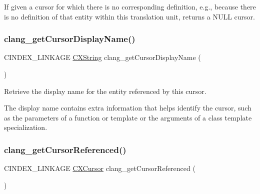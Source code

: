 If given a cursor for which there is no corresponding definition, e.\+g., because there is no definition of that entity within this translation unit, returns a N\+U\+LL cursor. \mbox{\label{group__CINDEX__CURSOR__XREF_gac3eba3224d109a956f9ef96fd4fe5c83}} 
\subsubsection{\texorpdfstring{clang\+\_\+get\+Cursor\+Display\+Name()}{clang\_getCursorDisplayName()}}
{\footnotesize\ttfamily C\+I\+N\+D\+E\+X\+\_\+\+L\+I\+N\+K\+A\+GE \mbox{\hyperlink{structCXString}{C\+X\+String}} clang\+\_\+get\+Cursor\+Display\+Name (\begin{DoxyParamCaption}\item[{\mbox{\hyperlink{structCXCursor}{C\+X\+Cursor}}}]{ }\end{DoxyParamCaption})}



Retrieve the display name for the entity referenced by this cursor. 

The display name contains extra information that helps identify the cursor, such as the parameters of a function or template or the arguments of a class template specialization. \mbox{\label{group__CINDEX__CURSOR__XREF_gabf059155921552e19fc2abed5b4ff73a}} 
\subsubsection{\texorpdfstring{clang\+\_\+get\+Cursor\+Referenced()}{clang\_getCursorReferenced()}}
{\footnotesize\ttfamily C\+I\+N\+D\+E\+X\+\_\+\+L\+I\+N\+K\+A\+GE \mbox{\hyperlink{structCXCursor}{C\+X\+Cursor}} clang\+\_\+get\+Cursor\+Referenced (\begin{DoxyParamCaption}\item[{\mbox{\hyperlink{structCXCursor}{C\+X\+Cursor}}}]{ }\end{DoxyParamCaption})}



